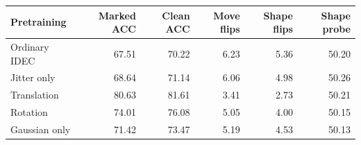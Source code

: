 \begin{tabular}{lrrrrr}
\toprule
Pretraining & Marked ACC & Clean ACC & Move flips & Shape flips & Shape probe\\
\midrule
Ordinary IDEC & 67.51 & 70.22 & 6.23 & 5.36 & 50.20\\
Jitter only & 68.64 & 71.14 & 6.06 & 4.98 & 50.26\\
Translation & 80.63 & 81.61 & 3.41 & 2.73 & 50.21\\
Rotation & 74.01 & 76.08 & 5.05 & 4.00 & 50.15\\
Gaussian only & 71.42 & 73.47 & 5.19 & 4.53 & 50.13\\
\bottomrule
\end{tabular}
